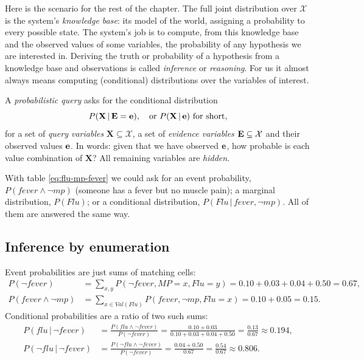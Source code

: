 \documentclass[11pt, oneside]{book}
\newcommand{\Prob}{\mathbb{P}}           %
\newcommand{\given}{\,\vert\,}           %
\newcommand{\Val}{\mathit{Val}}          %
\newcommand{\Xall}{\mathcal{X}}          %
\newcommand{\bX}{\mathbf{X}}  \newcommand{\bY}{\mathbf{Y}}
\newcommand{\vn}[1]{\mathit{#1}}         %
\let\originalsubsection\subsection
\renewcommand{\subsection}{\Needspace{6\baselineskip}\originalsubsection}
\begin{document}
Here is the scenario for the rest of the chapter. The full joint distribution
over $\Xall$ is the system's \emph{knowledge base}: its model of the world,
assigning a probability to every possible state. The system's job is to
compute, from this knowledge base and the observed values of some variables,
the probability of any hypothesis we are interested in. Deriving the truth or
probability of a hypothesis from a knowledge base and observations is called
\emph{inference} or \emph{reasoning}. For us it almost always means computing
(conditional) distributions over the variables of interest.

\begin{defbox}[title={Probabilistic query}]
A \emph{probabilistic query} asks for the conditional distribution
\[
  P(\bX \given \bE = \be), \quad\text{or } P(\bX \given \be) \text{ for short},
\]
for a set of \emph{query variables} $\bX \subseteq \Xall$, a set of
\emph{evidence variables} $\bE \subseteq \Xall$ and their observed values $\mathbf{e}$.
In words: given that we have observed $\mathbf{e}$, how probable is each value
combination of $\bX$? All remaining variables are \emph{hidden}.
\end{defbox}

With table \eqref{eq:flu-mp-fever} we could ask for an event probability,
$P(\vn{fever} \wedge \neg\vn{mp})$ (someone has a fever but no muscle pain); a
marginal distribution, $P(\vn{Flu})$; or a conditional distribution,
$P(\vn{Flu} \given \vn{fever}, \neg\vn{mp})$. All of them are answered the
same way.

\subsection{Inference by enumeration}

Event probabilities are just sums of matching cells:
\begin{align*}
P(\neg\vn{fever}) &= \sum_{x, y} P(\neg\vn{fever}, \vn{MP} = x, \vn{Flu} = y)
  = 0.10 + 0.03 + 0.04 + 0.50 = 0.67, \\
P(\vn{fever} \wedge \neg\vn{mp}) &= \sum_{x \in \Val(\vn{Flu})}
  P(\vn{fever}, \neg\vn{mp}, \vn{Flu} = x) = 0.10 + 0.05 = 0.15 .
\end{align*}
Conditional probabilities are a ratio of two such sums:
\begin{align*}
P(\vn{flu} \given \neg\vn{fever})
&= \frac{P(\vn{flu} \wedge \neg\vn{fever})}{P(\neg\vn{fever})}
= \frac{0.10 + 0.03}{0.10 + 0.03 + 0.04 + 0.50}
= \frac{0.13}{0.67} \approx 0.194, \\
P(\neg\vn{flu} \given \neg\vn{fever})
&= \frac{P(\neg\vn{flu} \wedge \neg\vn{fever})}{P(\neg\vn{fever})}
= \frac{0.04 + 0.50}{0.67} = \frac{0.54}{0.67} \approx 0.806 .
\end{align*}
\end{document}
